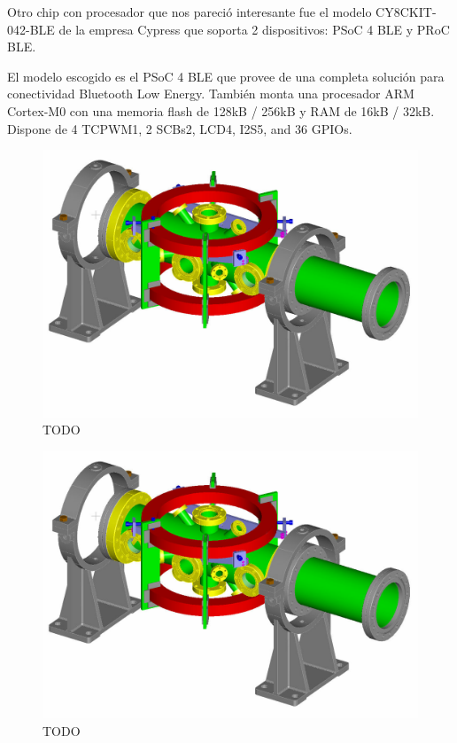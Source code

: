Otro chip con procesador que nos pareció interesante fue el modelo CY8CKIT-042-BLE de la empresa Cypress que soporta 2 dispositivos: PSoC 4 BLE y  PRoC BLE.

El modelo escogido es el PSoC 4 BLE que provee de una completa solución para conectividad Bluetooth Low Energy. También monta una procesador ARM Cortex-M0 con una memoria flash de 128kB / 256kB y RAM de 16kB / 32kB. Dispone de 4 TCPWM1, 2 SCBs2, LCD4, I2S5, and 36 GPIOs.

\begin{figure}[h]%
	\centering
    \includegraphics[scale=0.5]{figures/chamber.png} %

    \caption[TODO]{TODO}

   \label{figuraCypressPeque}
\end{figure}

\begin{figure}[h]%
	\centering
    \includegraphics[scale=0.5]{figures/chamber.png} %

    \caption[TODO]{TODO}

   \label{figuraCypressGrande}
\end{figure}

